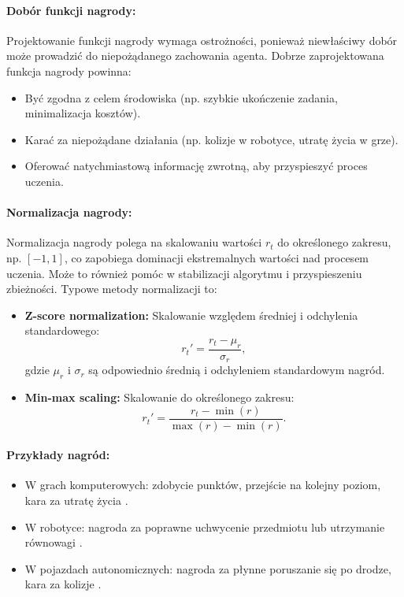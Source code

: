 \paragraph{Dobór funkcji nagrody:}
Projektowanie funkcji nagrody wymaga ostrożności, ponieważ niewłaściwy dobór może prowadzić do niepożądanego zachowania agenta. Dobrze zaprojektowana funkcja nagrody powinna:
\begin{itemize}
	\item Być zgodna z celem środowiska (np. szybkie ukończenie zadania, minimalizacja kosztów).
	\item Karać za niepożądane działania (np. kolizje w robotyce, utratę życia w grze).
	\item Oferować natychmiastową informację zwrotną, aby przyspieszyć proces uczenia.
\end{itemize}

\paragraph{Normalizacja nagrody:}
Normalizacja nagrody polega na skalowaniu wartości \(r_t\) do określonego zakresu, np. \([-1, 1]\), co zapobiega dominacji ekstremalnych wartości nad procesem uczenia. Może to również pomóc w stabilizacji algorytmu i przyspieszeniu zbieżności. Typowe metody normalizacji to:
\begin{itemize}
	\item \textbf{Z-score normalization:} Skalowanie względem średniej i odchylenia standardowego:
	      \[
		      r_t' = \frac{r_t - \mu_r}{\sigma_r},
	      \]
	      gdzie \(\mu_r\) i \(\sigma_r\) są odpowiednio średnią i odchyleniem standardowym nagród.
	\item \textbf{Min-max scaling:} Skalowanie do określonego zakresu:
	      \[
		      r_t' = \frac{r_t - \min(r)}{\max(r) - \min(r)}.
	      \]
\end{itemize}

\paragraph{Przykłady nagród:}
\begin{itemize}
	\item W grach komputerowych: zdobycie punktów, przejście na kolejny poziom, kara za utratę życia \cite{BELLEMARE2013}.
	\item W robotyce: nagroda za poprawne uchwycenie przedmiotu lub utrzymanie równowagi \cite{TODOROV2012}.
	\item W pojazdach autonomicznych: nagroda za płynne poruszanie się po drodze, kara za kolizje \cite{DOSOVITSKIY2017}.
\end{itemize}

